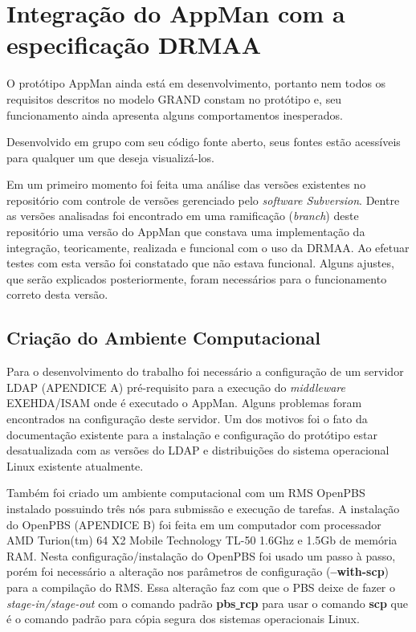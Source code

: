 \chapter{Integração do AppMan com a especificação DRMAA}
\label{cap:implementacao}

O protótipo AppMan ainda está em desenvolvimento, portanto nem todos os requisitos descritos no modelo GRAND constam no protótipo e, seu funcionamento ainda apresenta alguns comportamentos inesperados. 

Desenvolvido em grupo com seu código fonte aberto, seus fontes estão acessíveis para qualquer um que deseja visualizá-los. 

Em um primeiro momento foi feita uma análise das versões existentes no repositório com controle de versões gerenciado pelo \emph{software Subversion}. Dentre as versões analisadas foi encontrado em uma ramificação (\emph{branch}) deste repositório uma versão do AppMan que constava uma implementação da integração, teoricamente, realizada e funcional com o uso da DRMAA. Ao efetuar testes com esta versão foi constatado que não estava funcional. Alguns ajustes, que serão explicados posteriormente, foram necessários para o funcionamento correto desta versão.

\section{Criação do Ambiente Computacional}

Para o desenvolvimento do trabalho foi necessário a configuração de um servidor LDAP (APENDICE A) pré-requisito para a execução do \emph{middleware} EXEHDA/ISAM onde é executado o AppMan. Alguns problemas foram encontrados na configuração deste servidor. Um dos motivos foi o fato da documentação existente para a instalação e configuração do protótipo estar desatualizada com as versões do LDAP e distribuições do sistema operacional Linux existente atualmente. 

Também foi criado um ambiente computacional com um RMS OpenPBS instalado possuindo três nós para submissão e execução de tarefas. A instalação do OpenPBS (APENDICE B) foi feita em um computador com processador AMD Turion(tm) 64 X2 Mobile Technology TL-50 1.6Ghz e 1.5Gb de memória RAM. Nesta configuração/instalação do OpenPBS foi usado um passo à passo, porém foi necessário a alteração nos parâmetros de configuração (\textbf{--with-scp}) para a compilação do RMS. Essa alteração faz com que o PBS deixe de fazer o \emph{stage-in/stage-out} com o comando padrão \textbf{pbs\underline{ }rcp} para usar o comando \textbf{scp} que é o comando padrão para cópia segura dos sistemas operacionais Linux.

